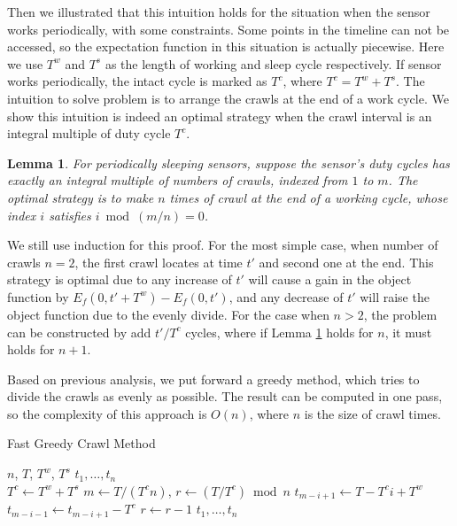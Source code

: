 \documentclass[conference]{IEEEtran}
\newtheorem{lemma}{Lemma}
\begin{document}
Then we illustrated that this intuition holds for the situation when the sensor works periodically, with some constraints.
Some points in the timeline can not be accessed, so the expectation function in this situation is actually piecewise.
Here we use $T^{w}$ and $T^{s}$ as the length of working and sleep cycle respectively.
If sensor works periodically, the intact cycle is marked as $T^{c}$, where $T^{c}=T^{w}+T^{s}$.
The intuition to solve problem is to arrange the crawls at the end of a work cycle.
We show this intuition is indeed an optimal strategy when the crawl interval is an integral multiple of duty cycle $T^{c}$.
\begin{lemma}
\label{evenly_s}
For periodically sleeping sensors, suppose the sensor's duty cycles has exactly an integral multiple of numbers of crawls, indexed from $1$ to $m$.
The optimal strategy is to make $n$ times of crawl at the end of a working cycle, whose index $i$ satisfies $i \bmod (m/n)=0$.
\end{lemma}
\begin{IEEEproof}
We still use induction for this proof.
For the most simple case, when number of crawls $n=2$, the first crawl locates at time $t'$ and second one at the end. 
This strategy is optimal due to any increase of $t'$ will cause a gain in the object function by $E_f(0,t'+T^{w})-E_f(0,t')$, and any decrease of $t'$ will raise the object function due to the evenly divide.
For the case when $n>2$, the problem can be constructed by add $t'/T^{c}$ cycles, where if Lemma \ref{evenly_s} holds for $n$, it must holds for $n+1$.
\end{IEEEproof}

Based on previous analysis, we put forward a greedy method, which tries to divide the crawls as evenly as possible. 
The result can be computed in one pass, so the complexity of this approach is $O(n)$, where $n$ is the size of crawl times.
\begin{algorithm}
	\caption{Fast Greedy Crawl Method}
	\begin{algorithmic}[1]
		\renewcommand{\algorithmicrequire}{\textbf{Input:}}
		\renewcommand{\algorithmicensure}{\textbf{Output:}}
		\REQUIRE $n$, $T$, $T^w$, $T^s$
		\ENSURE  $t_1,\ldots,t_n$
		\\ 
		\STATE $T^{c} \gets T^{w}+T^{s}$
		\STATE $m \gets T/(T^{c} n)$, $r\gets (T/T^{c})\bmod{n}$
		\STATE $t_{m-i+1}\gets T- T^{c} i + T^{w}$
		\STATE $t_{m-i-1}\gets t_{m-i+1}-T^{c}$
		\STATE $r\gets r-1$
		\ENDIF
		\ENDFOR
		\RETURN $t_1,\ldots,t_n$
	\end{algorithmic} 
\end{algorithm}
\end{document}
